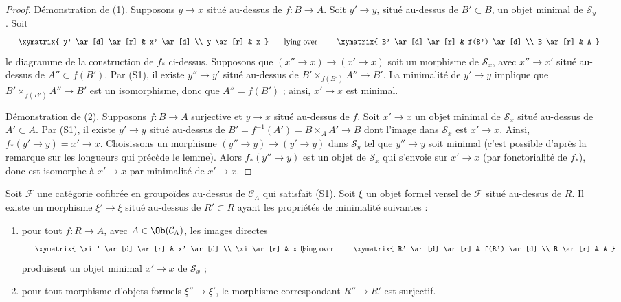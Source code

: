 \begin{proof}
Démonstration de (1). Supposons $y \to x$ situé au-dessus de $f : B \to A$.
Soit $y' \to y$, situé au-dessus de $B' \subset B$, un objet minimal de
$\mathcal{S}_y$. Soit
$$
\vcenter{
\xymatrix{
y' \ar[d] \ar[r] & x' \ar[d] \\
y \ar[r] & x
}
}
\quad\text{lying over}\quad
\vcenter{
\xymatrix{
B' \ar[d] \ar[r] & f(B') \ar[d] \\
B \ar[r] & A
}
}
$$
le diagramme de la construction de $f_*$ ci-dessus. Supposons que
$(x'' \to x) \to (x' \to x)$ soit un morphisme de $\mathcal{S}_x$, avec
$x'' \to x'$ situé au-dessus de $A'' \subset f(B')$. Par (S1), il existe
$y'' \to y'$ situé au-dessus de $B' \times_{f(B')} A'' \to B'$. La
minimalité de $y' \to y$ implique que
$B' \times_{f(B')} A'' \to B'$ est un isomorphisme, donc que
$A'' = f(B')$ ; ainsi, $x' \to x$ est minimal.

\medskip\noindent
Démonstration de (2). Supposons $f : B \to A$ surjective et $y \to x$ situé
au-dessus de $f$. Soit $x' \to x$ un objet minimal de $\mathcal{S}_x$ situé
au-dessus de $A' \subset A$. Par (S1), il existe $y' \to y$ situé au-dessus
de $B' = f^{-1}(A') = B \times_A A' \to B$ dont l'image dans
$\mathcal{S}_x$ est $x' \to x$. Ainsi, $f_*(y' \to y) = x' \to x$.
Choisissons un morphisme $(y'' \to y) \to (y' \to y)$ dans
$\mathcal{S}_y$ tel que $y'' \to y$ soit minimal (c'est possible d'après la
remarque sur les longueurs qui précède le lemme). Alors $f_*(y'' \to y)$ est
un objet de $\mathcal{S}_x$ qui s'envoie sur $x' \to x$ (par fonctorialité de
$f_*$), donc est isomorphe à $x' \to x$ par minimalité de $x' \to x$.
\end{proof}

\begin{lemma}
\label{lemma-smallest-where-descends-versal}
Soit $\mathcal{F}$ une catégorie cofibrée en groupoïdes au-dessus de
$\mathcal{C}_\Lambda$ qui satisfait (S1). Soit $\xi$ un objet formel versel de
$\mathcal{F}$ situé au-dessus de $R$. Il existe un morphisme $\xi' \to \xi$
situé au-dessus de $R' \subset R$ ayant les propriétés de minimalité
suivantes :
\begin{enumerate}
\item pour tout $f : R \to A$, avec $A \in \Ob(\mathcal{C}_\Lambda)$, les
images directes
$$
\vcenter{
\xymatrix{
\xi' \ar[d] \ar[r] & x' \ar[d] \\
\xi \ar[r] & x
}
}
\quad\text{lying over}\quad
\vcenter{
\xymatrix{
R' \ar[d] \ar[r] & f(R') \ar[d] \\
R \ar[r] & A
}
}
$$
produisent un objet minimal $x' \to x$ de $\mathcal{S}_x$ ;
\item pour tout morphisme d'objets formels $\xi'' \to \xi'$, le morphisme
correspondant $R'' \to R'$ est surjectif.
\end{enumerate}
\end{lemma}

